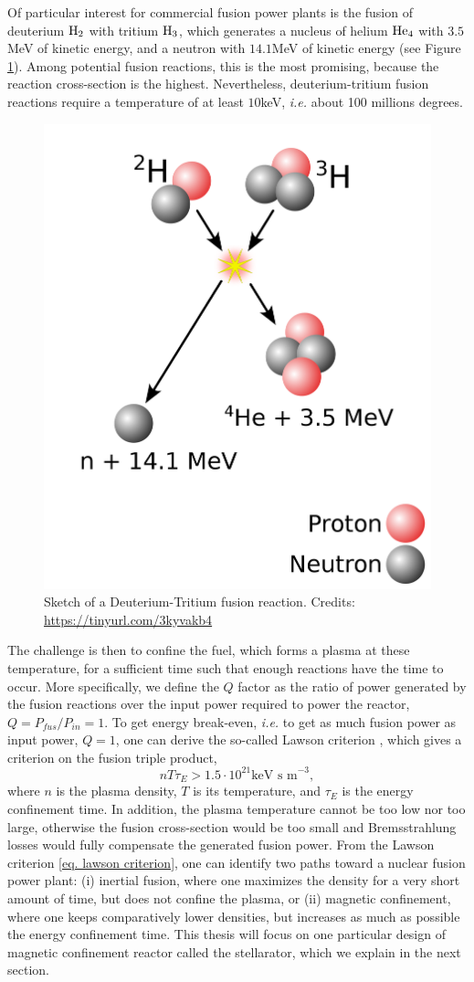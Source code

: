 \documentclass[my_thesis.tex]{subfiles}
\begin{document}
Of particular interest for commercial fusion power plants is the fusion of deuterium $\ce{H2}$ with tritium $\ce{H3}$, which generates a nucleus of helium $\ce{He4}$ with $3.5$MeV of kinetic energy, and a neutron with $14.1$MeV of kinetic energy (see Figure \ref{fig. dt fusion}). Among potential fusion reactions, this is the most promising, because the reaction cross-section is the highest. Nevertheless, deuterium-tritium fusion reactions require a temperature of at least $10$keV, \textit{i.e.} about 100 millions degrees. 
\begin{figure}
    \centering
    \includegraphics[width=.5\linewidth]{images/introduction/DTFusion.png}
    \caption{Sketch of a Deuterium-Tritium fusion reaction. Credits: \url{https://tinyurl.com/3kyvakb4}}
    \label{fig. dt fusion}
\end{figure}

The challenge is then to confine the fuel, which forms a plasma at these temperature, for a sufficient time such that enough reactions have the time to occur. More specifically, we define the $Q$ factor as the ratio of power generated by the fusion reactions over the input power required to power the reactor, $Q=P_{fus}/P_{in}=1$. To get energy break-even, \textit{i.e.} to get as much fusion power as input power, $Q=1$, one can derive the so-called Lawson criterion \citep{lawsonCriteriaPowerProducing1957}, which gives a criterion on the fusion triple product,
\begin{equation}
    nT\tau_E > 1.5\cdot 10^{21}\text{keV s m}^{-3}, \label{eq. lawson criterion}
\end{equation} 
where $n$ is the plasma density, $T$ is its temperature, and $\tau_E$ is the energy confinement time. In addition, the plasma temperature cannot be too low nor too large, otherwise the fusion cross-section would be too small and Bremsstrahlung losses would fully compensate the generated fusion power. From the Lawson criterion \ref{eq. lawson criterion}, one can identify two paths toward a nuclear fusion power plant: (i) inertial fusion, where one maximizes the density for a very short amount of time, but does not confine the plasma, or (ii) magnetic confinement, where one keeps comparatively lower densities, but increases as much as possible the energy confinement time. This thesis will focus on one particular design of magnetic confinement reactor called the stellarator, which we explain in the next section.
\end{document}
